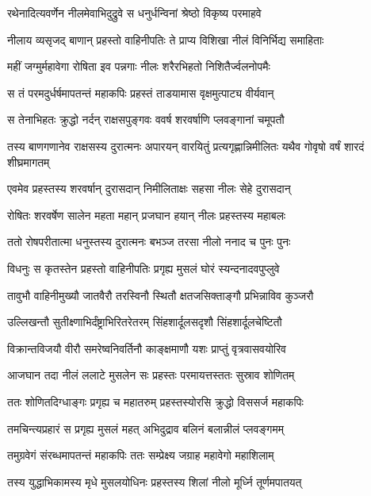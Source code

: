 \twolineshloka
{रथेनादित्यवर्णेन नीलमेवाभिदुद्रुवे}
{स धनुर्धन्विनां श्रेष्ठो विकृष्य परमाहवे} %

\twolineshloka
{नीलाय व्यसृजद् बाणान् प्रहस्तो वाहिनीपतिः}
{ते प्राप्य विशिखा नीलं विनिर्भिद्य समाहिताः} %

\twolineshloka
{महीं जग्मुर्महावेगा रोषिता इव पन्नगाः}
{नीलः शरैरभिहतो निशितैर्ज्वलनोपमैः} %

\twolineshloka
{स तं परमदुर्धर्षमापतन्तं महाकपिः}
{प्रहस्तं ताडयामास वृक्षमुत्पाट्य वीर्यवान्} %

\twolineshloka
{स तेनाभिहतः क्रुद्धो नर्दन् राक्षसपुङ्गवः}
{ववर्ष शरवर्षाणि प्लवङ्गानां चमूपतौ} %

\threelineshloka
{तस्य बाणगणानेव राक्षसस्य दुरात्मनः}
{अपारयन् वारयितुं प्रत्यगृह्णान्निमीलितः}
{यथैव गोवृषो वर्षं शारदं शीघ्रमागतम्} %

\twolineshloka
{एवमेव प्रहस्तस्य शरवर्षान् दुरासदान्}
{निमीलिताक्षः सहसा नीलः सेहे दुरासदान्} %

\twolineshloka
{रोषितः शरवर्षेण सालेन महता महान्}
{प्रजघान हयान् नीलः प्रहस्तस्य महाबलः} %

\twolineshloka
{ततो रोषपरीतात्मा धनुस्तस्य दुरात्मनः}
{बभञ्ज तरसा नीलो ननाद च पुनः पुनः} %

\twolineshloka
{विधनुः स कृतस्तेन प्रहस्तो वाहिनीपतिः}
{प्रगृह्य मुसलं घोरं स्यन्दनादवपुप्लुवे} %

\twolineshloka
{तावुभौ वाहिनीमुख्यौ जातवैरौ तरस्विनौ}
{स्थितौ क्षतजसिक्ताङ्गौ प्रभिन्नाविव कुञ्जरौ} %

\twolineshloka
{उल्लिखन्तौ सुतीक्ष्णाभिर्दंष्ट्राभिरितरेतरम्}
{सिंहशार्दूलसदृशौ सिंहशार्दूलचेष्टितौ} %

\twolineshloka
{विक्रान्तविजयौ वीरौ समरेष्वनिवर्तिनौ}
{काङ्क्षमाणौ यशः प्राप्तुं वृत्रवासवयोरिव} %

\twolineshloka
{आजघान तदा नीलं ललाटे मुसलेन सः}
{प्रहस्तः परमायत्तस्ततः सुस्राव शोणितम्} %

\twolineshloka
{ततः शोणितदिग्धाङ्गः प्रगृह्य च महातरुम्}
{प्रहस्तस्योरसि क्रुद्धो विससर्ज महाकपिः} %

\twolineshloka
{तमचिन्त्यप्रहारं स प्रगृह्य मुसलं महत्}
{अभिदुद्राव बलिनं बलान्नीलं प्लवङ्गमम्} %

\twolineshloka
{तमुग्रवेगं संरब्धमापतन्तं महाकपिः}
{ततः सम्प्रेक्ष्य जग्राह महावेगो महाशिलाम्} %

\twolineshloka
{तस्य युद्धाभिकामस्य मृधे मुसलयोधिनः}
{प्रहस्तस्य शिलां नीलो मूर्ध्नि तूर्णमपातयत्} %

